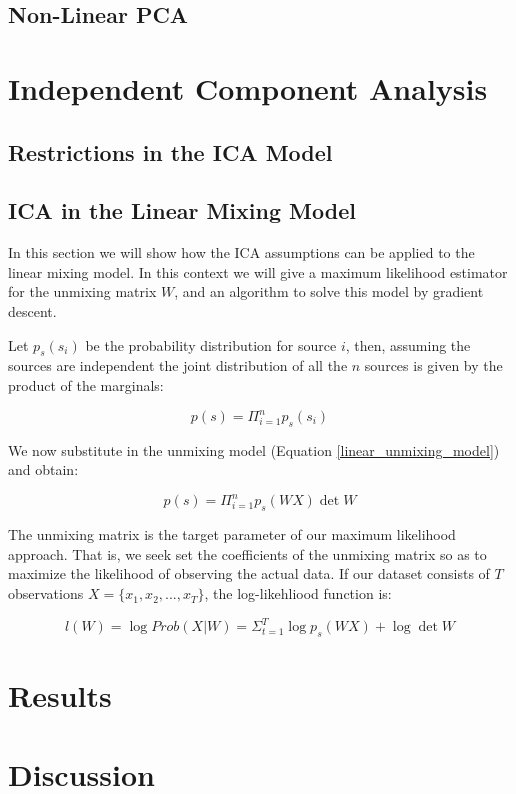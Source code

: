 \message{ !name(main.tex)}\documentclass[]{report}   %
\begin{document}
\section{Non-Linear PCA}


\chapter{Independent Component Analysis}

\section{Restrictions in the ICA Model}\label{ICA_restrictions}

\section{ICA in the Linear Mixing Model}

In this section we will show how the ICA assumptions can be applied to the linear mixing model. In this context we will give a maximum likelihood estimator for the unmixing matrix $W$, and an algorithm to solve this model by gradient descent.

Let $p_s(s_i)$ be the probability distribution for source $i$, then, assuming the sources are independent the joint distribution of all the $n$ sources is given by the product of the marginals:

\begin{equation}
  p(s) = \Pi_{i=1}^n p_s(s_i)
\end{equation}

We now substitute in the unmixing model (Equation \ref{linear_unmixing_model}) and obtain:

\begin{equation}
  p(s) = \Pi_{i=1}^n p_s(WX) \det W
\end{equation}

The unmixing matrix is the target parameter of our maximum likelihood approach. That is, we seek set the coefficients of the unmixing matrix so as to maximize the likelihood of observing the actual data. If our dataset consists of $T$ observations $X = \{x_1,x_2,...,x_T\}$, the log-likehliood function is:

\begin{equation}
  l(W) =\log Prob(X|W)= \Sigma_{t=1}^T \log p_s(WX)+\log \det W
\end{equation}

\chapter{Results}

\chapter{Discussion}

\begin{thebibliography}{9}
  
\end{thebibliography}
\end{document}
